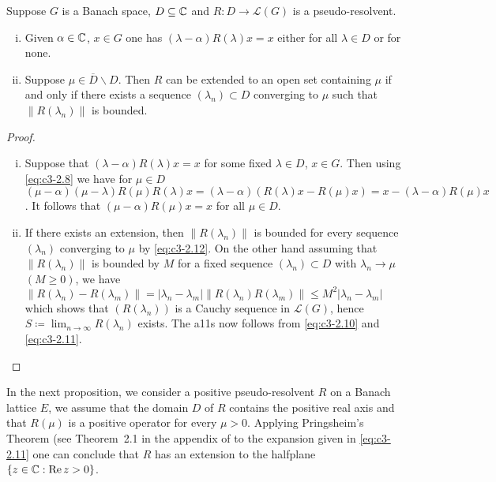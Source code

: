 \begin{proposition}\label{prop:c3-2.6}
	Suppose $G$ is a Banach space, $D \subseteq \mathbb{C} $ and $R \colon D \to \mathcal{L}(G)$ is a pseudo-resolvent.
	
	\begin{enumerate}[(i), wide]
		\item Given $\alpha \in \mathbb{C} $, $x \in G$ one has $(\lambda-\alpha)R(\lambda)x = x$ either for all $\lambda \in D$ or for none.
		
		\item Suppose $\mu \in \overline{D}\backslash D$. Then $R$ can be extended to an open set containing $\mu$ if and only if there exists a sequence $(\lambda_{n}) \subset D$ converging to $\mu$ such that $\|R(\lambda_{n})\|$ is bounded.
	\end{enumerate}
\end{proposition}

\begin{proof}
	\begin{enumerate}[(i), wide]
		\item Suppose that $(\lambda-\alpha)R(\lambda)x = x$ for some fixed $\lambda \in D$, $x \in G$.
		Then using \eqref{eq:c3-2.8} we have for $\mu \in D$ $(\mu-\alpha)(\mu-\lambda)R(\mu)R(\lambda)x = (\lambda-\alpha)(R(\lambda)x - R(\mu)x) = x - (\lambda-\alpha)R(\mu)x$.
		It follows that $(\mu-\alpha)R(\mu)x = x$ for all $\mu \in D$.
		
		\item If there exists an extension, then $\|R(\lambda_{n})\|$ is bounded for every sequence $(\lambda_{n})$ converging to $\mu$ by \eqref{eq:c3-2.12}.
		On the other hand assuming that $\|R(\lambda_{n})\|$ is bounded by $M$ for a fixed sequence $(\lambda_{n}) \subset D$ with $\lambda_{n} \to \mu$ $(M \geq 0)$, we have
		\newline
		 $\|R(\lambda_{n}) - R(\lambda_{m})\| = |\lambda_{n}-\lambda_{m}| \|R(\lambda_{n})R(\lambda_{m})\| \leq M^2|\lambda_{n}-\lambda_{m}|$ which shows that $(R(\lambda_{n}))$ is a Cauchy sequence in $\mathcal{L}(G)$, hence $S \coloneq \lim_{n\to\infty}R(\lambda_{n})$ exists.
		The a11s now follows from \eqref{eq:c3-2.10} and \eqref{eq:c3-2.11}.
	\end{enumerate}
\end{proof}

In the next proposition, we consider a positive pseudo-resolvent $R$ on a Banach lattice $E$, \ie  we assume that the domain $D$ of $R$ contains the positive real axis and that $R(\mu)$ is a positive operator for every $\mu > 0$.
Applying Pringsheim's Theorem (see Theorem~2.1 in the appendix
%
%
of \citet{schaefer:1966} to the expansion given in \eqref{eq:c3-2.11} one can conclude that $R$ has an extension to the halfplane $\{z \in \mathbb{C}  : \mathop{}\!\mathrm{Re}\, z > 0\}$.

